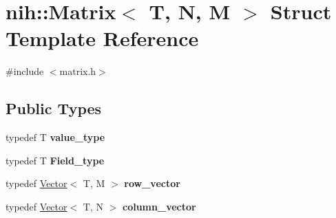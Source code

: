 \hypertarget{structnih_1_1_matrix}{
\section{nih\-:\-:\-Matrix$<$ \-T, \-N, \-M $>$ \-Struct \-Template \-Reference}
\label{structnih_1_1_matrix}
}


{\ttfamily \#include $<$matrix.\-h$>$}

\subsection*{\-Public \-Types}
\begin{DoxyCompactItemize}
\item 
\hypertarget{structnih_1_1_matrix_a57a6a191f034235a2090e25f7e4216bc}{
typedef \-T {\bfseries value\-\_\-type}}
\label{structnih_1_1_matrix_a57a6a191f034235a2090e25f7e4216bc}

\item 
\hypertarget{structnih_1_1_matrix_a084e3e4c41631a62d3eeeb2b434fa821}{
typedef \-T {\bfseries \-Field\-\_\-type}}
\label{structnih_1_1_matrix_a084e3e4c41631a62d3eeeb2b434fa821}

\item 
\hypertarget{structnih_1_1_matrix_a5fda3b8edf6f01802cb90be364fb25a6}{
typedef \hyperlink{structnih_1_1_vector}{\-Vector}$<$ \-T, \-M $>$ {\bfseries row\-\_\-vector}}
\label{structnih_1_1_matrix_a5fda3b8edf6f01802cb90be364fb25a6}

\item 
\hypertarget{structnih_1_1_matrix_a163c5c162d300e8dccac52a74a8df252}{
typedef \hyperlink{structnih_1_1_vector}{\-Vector}$<$ \-T, \-N $>$ {\bfseries column\-\_\-vector}}
\label{structnih_1_1_matrix_a163c5c162d300e8dccac52a74a8df252}

\end{DoxyCompactItemize}
